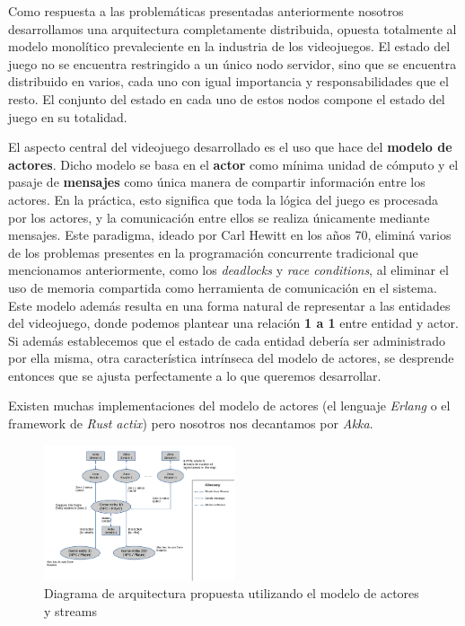 
\noindent Como respuesta a las problemáticas presentadas anteriormente nosotros desarrollamos una arquitectura
completamente distribuida, opuesta totalmente al modelo monolítico prevaleciente en la industria de los videojuegos. 
El estado del juego no se encuentra restringido a un único nodo servidor, sino que se encuentra 
distribuido en varios, cada uno con igual importancia y responsabilidades que el resto. El conjunto del estado en cada uno de estos nodos compone el 
estado del juego en su totalidad.

El aspecto central del videojuego desarrollado es el uso que hace del \textbf{modelo de actores}.
Dicho modelo se basa en el \textbf{actor} como mínima unidad de cómputo y el pasaje de \textbf{mensajes} como única manera
de compartir información entre los actores. En la práctica, esto significa que toda la lógica del juego
es procesada por los actores, y la comunicación entre ellos se realiza únicamente mediante mensajes.
Este paradigma, ideado por Carl Hewitt en los años 70, eliminá varios de los problemas presentes
en la programación concurrente tradicional que mencionamos anteriormente, como
los \textit{deadlocks} y \textit{race conditions}, al eliminar el uso de memoria compartida
como herramienta de comunicación en el sistema.
Este modelo además resulta en una forma natural de representar a las entidades del videojuego, donde podemos plantear una 
relación \textbf{1 a 1} entre entidad y actor. Si además establecemos que el estado de cada entidad 
debería ser administrado por ella misma, otra característica intrínseca del modelo de actores,
se desprende entonces que se ajusta perfectamente a lo que queremos desarrollar.

Existen muchas implementaciones del modelo de actores (el lenguaje \textit{Erlang} o el framework de 
\textit{Rust actix}) pero nosotros nos decantamos por \textit{Akka}.


\begin{figure}[htbp]
    \centering
    \includegraphics[width=0.5\textwidth]{../assets/architecture.png}
    \caption{Diagrama de arquitectura propuesta utilizando el modelo de actores y streams}
\end{figure}

